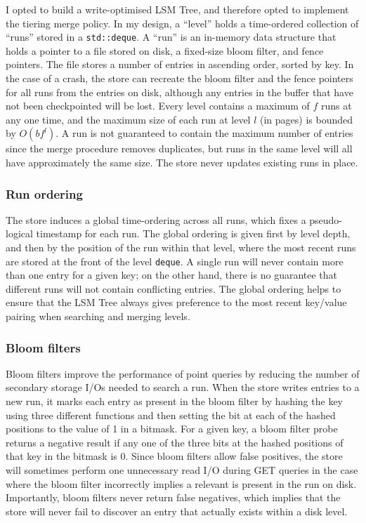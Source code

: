 \documentclass{acm}
\begin{document}
I opted to build a write-optimised LSM Tree, and therefore opted to implement the tiering merge policy. In my design, a ``level'' holds a time-ordered collection of ``runs'' stored in a \texttt{std::deque}. A ``run'' is an in-memory data structure that holds a pointer to a file stored on disk, a fixed-size bloom filter, and fence pointers. The file stores a number of entries in ascending order, sorted by key. In the case of a crash, the store can recreate the bloom filter and the fence pointers for all runs from the entries on disk, although any entries in the buffer that have not been checkpointed will be lost. Every level contains a maximum of $f$ runs at any one time, and the maximum size of each run at level $l$ (in pages) is bounded by $O(bf^l)$. A run is not guaranteed to contain the maximum number of entries since the merge procedure removes duplicates, but runs in the same level will all have approximately the same size. The store never updates existing runs in place.

\subsubsection{Run ordering}

The store induces a global time-ordering across all runs, which fixes a pseudo-logical timestamp for each run. The global ordering is given first by level depth, and then by the position of the run within that level, where the most recent runs are stored at the front of the level \texttt{deque}. A single run will never contain more than one entry for a given key; on the other hand, there is no guarantee that different runs will not contain conflicting entries. The global ordering helps to ensure that the LSM Tree always gives preference to the most recent key/value pairing when searching and merging levels.

\subsubsection{Bloom filters}

Bloom filters improve the performance of point queries by reducing the number of secondary storage I/Os needed to search a run. When the store writes entries to a new run, it marks each entry as present in the bloom filter by hashing the key using three different functions and then setting the bit at each of the hashed positions to the value of 1 in a bitmask. For a given key, a bloom filter probe returns a negative result if any one of the three bits at the hashed positions of that key in the bitmask is 0. Since bloom filters allow false positives, the store will sometimes perform one unnecessary read I/O during GET queries in the case where the bloom filter incorrectly implies a relevant is present in the run on disk. Importantly, bloom filters never return false negatives, which implies that the store will never fail to discover an entry that actually exists within a disk level.
\end{document}
